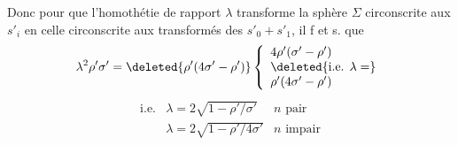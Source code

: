 Donc pour que l'homothétie de rapport $\lambda$ transforme la sphère
$\Sigma$ circonscrite aux $s'_i$ en celle circonscrite aux transformés des
$s'_0+s'_1$, il f et s. que
\[
\lambda^2\rho'\sigma'
=\deleted{\rho'(4\sigma'-\rho')}
\left\{\begin{array}{l}
4\rho'(\sigma'-\rho')\\
\deleted{\text{i.e. }\lambda=}\\
\rho'(4\sigma'-\rho')
\end{array}\right.
\]
\[
\begin{array}{lll}
\text{i.e.}&\lambda=2\sqrt{1-\rho'/\sigma'}&n\text{ pair}\\
&\lambda=2\sqrt{1-\rho'/4\sigma'}&n\text{ impair}
\end{array}
\]

